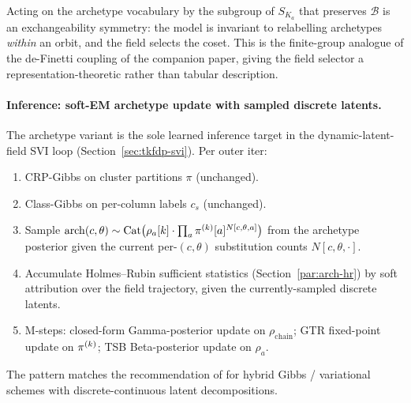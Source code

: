 \begin{remark}
Acting on the archetype vocabulary by the subgroup of $S_{K_a}$ that
preserves $\mathcal{B}$ is an exchangeability symmetry: the model is
invariant to relabelling archetypes \emph{within} an orbit, and the field
selects the coset. This is the finite-group analogue of the de-Finetti
coupling of the companion paper, giving the field selector a
representation-theoretic rather than tabular description.
\end{remark}

\paragraph{Inference: soft-EM archetype update with sampled discrete
latents.}
The archetype variant is the sole learned inference target in the
dynamic-latent-field SVI loop (Section~\ref{sec:tkfdp-svi}). Per
outer iter:
\begin{enumerate}
  \item CRP-Gibbs on cluster partitions $\pi$ (unchanged).
  \item Class-Gibbs on per-column labels $c_s$ (unchanged).
  \item Sample $\mathrm{arch}(c,\theta) \sim \mathrm{Cat}\bigl(\rho_a[k]\cdot
    \prod_a \pi^{(k)}[a]^{N[c,\theta,a]}\bigr)$ from the archetype
    posterior given the current per-$(c,\theta)$ substitution counts
    $N[c,\theta,\cdot]$.
  \item Accumulate Holmes--Rubin sufficient statistics
    (Section~\ref{par:arch-hr}) by soft attribution over the field
    trajectory, given the currently-sampled discrete latents.
  \item M-steps: closed-form Gamma-posterior update on
    $\rho_{\text{chain}}$; GTR fixed-point update on $\pi^{(k)}$;
    TSB Beta-posterior update on $\rho_a$.
\end{enumerate}
The pattern matches the recommendation of
\citet[Section~4]{bealghahramani2002} for hybrid Gibbs / variational
schemes with discrete-continuous latent decompositions.

